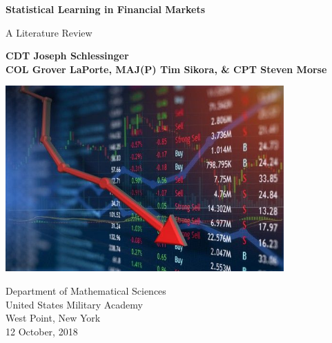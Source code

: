 \documentclass[12pt]{article}
\begin{document}

\begin{titlepage}
	\begin{center}
		\vspace*{1cm}
		
		\textbf{\large Statistical Learning in Financial Markets}
		
		\vspace{0.5cm}
		A Literature Review
		
		\vspace{1.5cm}
		
		\textbf{CDT Joseph Schlessinger \\ COL Grover LaPorte, MAJ(P) Tim Sikora, \& CPT Steven Morse}
		
		\vfill
		
		
		\vspace{0.8cm}
		
		\includegraphics[width=0.8\textwidth]{stock.jpg}
		
		\vfill 
		Department of Mathematical Sciences\\
		United States Military Academy\\
		West Point, New York\\
		12 October, 2018
		
	\end{center}
\end{titlepage}
\end{document}

